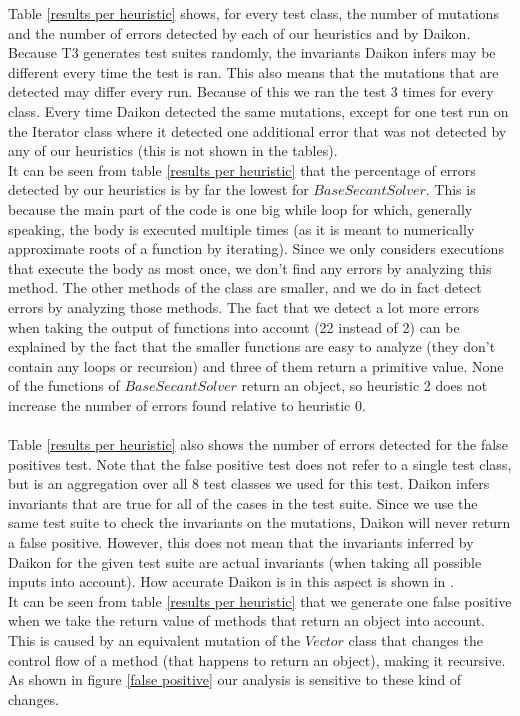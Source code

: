 \documentclass[a4paper, fleqn]{article}
\begin{document}
Table \ref{results per heuristic} shows, for every test class, the number of mutations and the number of errors detected by each of our heuristics and by Daikon. Because T3 generates test suites randomly, the invariants Daikon infers may be different every time the test is ran. This also means that the mutations that are detected may differ every run. Because of this we ran the test 3 times for every class. Every time Daikon detected the same mutations, except for one test run on the Iterator class where it detected one additional error that was not detected by any of our heuristics (this is not shown in the tables).
\\
It can be seen from table \ref{results per heuristic} that the percentage of errors detected by our heuristics is by far the lowest for $BaseSecantSolver$. This is because the main part of the code is one big while loop for which, generally speaking, the body is executed multiple times (as it is meant to numerically approximate roots of a function by iterating). Since we only considers executions that execute the body as most once, we don't find any errors by analyzing this method. The other methods of the class are smaller, and we do in fact detect errors by analyzing those methods. The fact that we detect a lot more errors when taking the output of functions into account (22 instead of 2) can be explained by the fact that the smaller functions are easy to analyze (they don't contain any loops or recursion) and three of them return a primitive value. None of the functions of $BaseSecantSolver$ return an object, so heuristic 2 does not increase the number of errors found relative to heuristic 0.
\\\\
Table \ref{results per heuristic} also shows the number of errors detected for the false positives test. Note that the false positive test does not refer to a single test class, but is an aggregation over all 8 test classes we used for this test. Daikon infers invariants that are true for all of the cases in the test suite. Since we use the same test suite to check the invariants on the mutations, Daikon will never return a false positive. However, this does not mean that the invariants inferred by Daikon for the given test suite are actual invariants (when taking all possible inputs into account). How accurate Daikon is in this aspect is shown in \cite{nguyen}.
\\
It can be seen from table \ref{results per heuristic} that we generate one false positive when we take the return value of methods that return an object into account. This is caused by an equivalent mutation of the $Vector$ class that changes the control flow of a method (that happens to return an object), making it recursive. As shown in figure \ref{false positive} our analysis is sensitive to these kind of changes.
\end{document}
